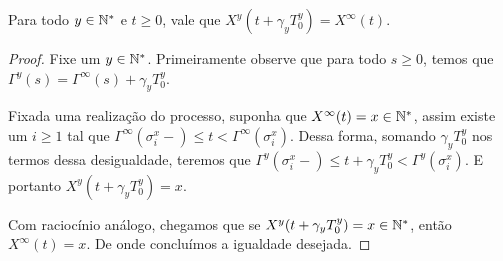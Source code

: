 \begin{proposicao}
  \label{prop:reinicia-infinito}
  Para todo $y \in {\mathbb{N^*}}$ e $t \geq 0$, vale que
  $X^y(t + \gamma_y T_0^y) = X^\infty(t)$.
\end{proposicao}
\begin{proof}
  Fixe um $y \in {\mathbb{N^*}}$. Primeiramente observe que para todo $s \geq 0$,
  temos que $\Gamma^y(s) = \Gamma^\infty(s) + \gamma_yT^y_0$.

  Fixada uma realização do processo, suponha que $X^\infty(t) = x \in
  {\mathbb{N^*}}$, assim existe um $i \geq 1$ tal que $\Gamma^\infty(\sigma_i^x-)
  \leq t < \Gamma^\infty(\sigma_i^x)$. Dessa forma, somando $\gamma_y
  T^y_0$ nos termos dessa desigualdade, teremos que
  $\Gamma^y(\sigma_i^x-) \leq t+\gamma_yT_0^y <
  \Gamma^y(\sigma_i^x)$. E portanto $X^y(t+\gamma_y T_0^y) = x$.

  Com raciocínio análogo, chegamos que se $X^y(t+\gamma_y T_0^y) = x
  \in {\mathbb{N^*}}$, então $X^\infty(t) = x$. De onde concluímos a igualdade desejada.
\end{proof}


